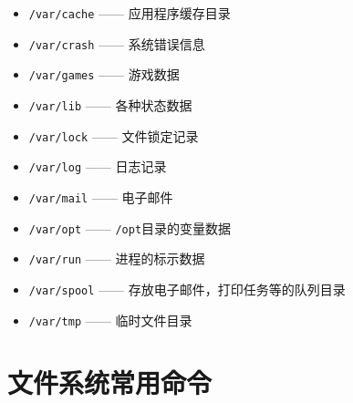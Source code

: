 \documentclass[doctor,openright,twoside]{sjtuthesis}
\providecommand{\tightlist}{%
    \setlength{\itemsep}{0pt}\setlength{\parskip}{0pt}}
\newcommand{\passthrough}[1]{#1}
\theoremstyle{plain}
\theoremstyle{definition}
\theoremstyle{remark}
\theoremstyle{ocrenumbox}
\theoremstyle{plain}
\begin{document}
\begin{itemize}
  \begin{itemize}
  \tightlist
  \item
    \passthrough{\lstinline!/var/cache!} ------ 应用程序缓存目录
  \item
    \passthrough{\lstinline!/var/crash!} ------ 系统错误信息
  \item
    \passthrough{\lstinline!/var/games!} ------ 游戏数据
  \item
    \passthrough{\lstinline!/var/lib!} ------ 各种状态数据
  \item
    \passthrough{\lstinline!/var/lock!} ------ 文件锁定记录
  \item
    \passthrough{\lstinline!/var/log!} ------ 日志记录
  \item
    \passthrough{\lstinline!/var/mail!} ------ 电子邮件
  \item
    \passthrough{\lstinline!/var/opt!} ------ \passthrough{\lstinline!/opt!}目录的变量数据
  \item
    \passthrough{\lstinline!/var/run!} ------ 进程的标示数据
  \item
    \passthrough{\lstinline!/var/spool!} ------ 存放电子邮件，打印任务等的队列目录
  \item
    \passthrough{\lstinline!/var/tmp!} ------ 临时文件目录
  \end{itemize}
\end{itemize}

\hypertarget{section-59}{%
\section{文件系统常用命令}\label{section-59}}
\end{document}
